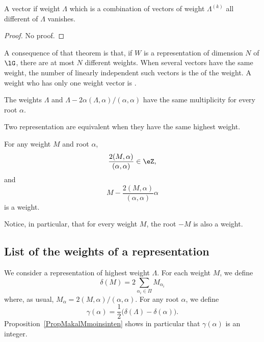 \begin{theorem}
	A vector if weight $\Lambda$ which is a combination of vectors of weight $\Lambda^{(k)}$ all different of $\Lambda$ vanishes.
\end{theorem}
\begin{proof}
	No proof.
\end{proof}
A consequence of that theorem is that, if $W$ is a representation of dimension $N$ of $\lG$, there are at most $N$ different weights. When several vectors have the same weight, the number of linearly independent such vectors is the  of the weight. A weight who has only one weight vector is .

\begin{proposition}
	The weights $\Lambda$ and $\Lambda-2\alpha(\Lambda,\alpha)/(\alpha,\alpha)$ have the same multiplicity for every root $\alpha$.
\end{proposition}

\begin{theorem}
	Two representation are equivalent when they have the same highest weight.
\end{theorem}

\begin{proposition}     \label{PropMakalMmoinsinten}
	For any weight $M$ and root $\alpha$,
	\begin{equation}
		\frac{ 2(M,\alpha) }{ (\alpha,\alpha) }\in\eZ,
	\end{equation}
	and
	\begin{equation}
		M-\frac{ 2(M,\alpha) }{ (\alpha,\alpha) }\alpha
	\end{equation}
	is a weight.
\end{proposition}
Notice, in particular,  that for every weight $M$, the root $-M$ is also a weight.

\subsection{List of the weights of a representation}

We consider a representation of highest weight $\Lambda$. For each weight $M$, we define
\begin{equation}
	\delta(M)=2\sum_{\alpha_i\in\Pi}M_{\alpha_i}
\end{equation}
where, as usual, $M_{\alpha}=2(M,\alpha)/(\alpha,\alpha)$. For any root $\alpha$, we define
\begin{equation}
	\gamma(\alpha)=\frac{ 1 }{2}\big( \delta(\Lambda)-\delta(\alpha) \big).
\end{equation}
Proposition~\ref{PropMakalMmoinsinten} shows in particular that $\gamma(\alpha)$ is an integer.


